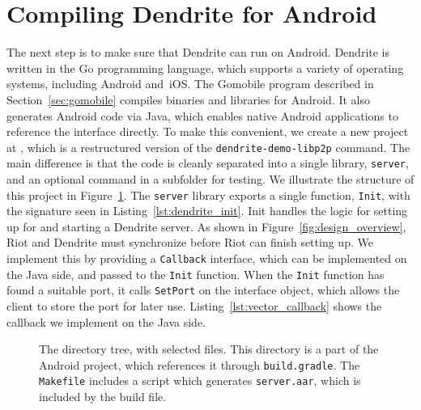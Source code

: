 
\section{Compiling Dendrite for Android}
The next step is to make sure that Dendrite can run on Android.
Dendrite is written in the Go programming language, which supports a variety of operating systems, including Android and~iOS\@.
The Gomobile program described in Section~\ref{sec:gomobile} compiles binaries and libraries for Android.
It also generates Android code via Java, which enables native Android applications to reference the interface directly.
To make this convenient, we create a new project at , which is a restructured version of the \texttt{dendrite-demo-libp2p} command.
The main difference is that the code is cleanly separated into a single library, \texttt{server}, and an optional command in a subfolder for testing.
We illustrate the structure of this project in Figure~\ref{fig:dirtree_server}.
The \texttt{server} library exports a single function, \texttt{Init}, with the signature seen in Listing~\ref{lst:dendrite_init}.
Init handles the logic for setting up for and starting a Dendrite server.
As shown in Figure~\ref{fig:design_overview}, Riot and Dendrite must synchronize before Riot can finish setting up.
We implement this by providing a \texttt{Callback} interface, which can be implemented on the Java side, and passed to the \texttt{Init} function.
When the \texttt{Init} function has found a suitable port, it calls \texttt{SetPort} on the interface object, which allows the client to store the port for later use.
Listing~\ref{lst:vector_callback} shows the callback we implement on the Java side.

\begin{figure}
	\caption{%
		The  directory tree, with selected files.
		This directory is a part of the Android project, which references it through \texttt{build.gradle}.
		The \texttt{Makefile} includes a script which generates \texttt{server.aar}, which is included by the build file.
	}%
	\label{fig:dirtree_server}
\end{figure}

